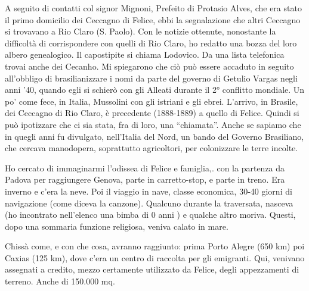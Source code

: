 \documentclass[a4paper,10pt]{book}
\begin{document}
A seguito di contatti col signor Mignoni, Prefeito di Protasio Alves, che era stato il primo domicilio dei Ceccagno di Felice, ebbi la segnalazione che altri Ceccagno si trovavano a Rio Claro (S. Paolo).\newline
Con le notizie ottenute, nonostante la difficoltà di corrispondere con quelli di Rio Claro, ho redatto una bozza del loro albero genealogico. Il capostipite si chiama Lodovico. Da una lista telefonica trovai anche dei Cecanho. Mi spiegarono che ciò può essere accaduto in seguito all’obbligo di brasilianizzare i nomi da parte del governo di Getulio Vargas negli anni ’40, quando egli si schierò con gli Alleati durante il 2° conflitto mondiale. Un po’ come fece, in Italia, Mussolini con gli istriani e gli ebrei.\newline
L’arrivo, in Brasile, dei  Ceccagno di Rio Claro, è precedente (1888-1889) a quello di Felice. Quindi si può ipotizzare che ci sia stata, fra di loro, una “chiamata”. Anche se sapiamo che in quegli anni fu divulgato, nell’Italia del Nord, un bando del Governo Brasiliano, che cercava manodopera, soprattutto agricoltori, per colonizzare le terre incolte. 

Ho cercato di immaginarmi l’odissea di Felice e famiglia,. con la partenza da Padova per raggiungere Genova, parte in carretto-stop, e parte in treno. Era inverno e c’era la neve. Poi il viaggio in nave, classe economica, 30-40 giorni di navigazione (come diceva la canzone). Qualcuno durante la traversata, nasceva (ho incontrato nell’elenco una bimba di 0 anni ) e qualche altro moriva. Questi, dopo una sommaria funzione religiosa, veniva calato in mare.  

Chissà come, e con che cosa, avranno raggiunto: prima Porto Alegre (650 km) poi Caxias (125 km), dove c’era un centro di raccolta per gli emigranti. Qui, venivano assegnati a credito, mezzo certamente utilizzato da Felice, degli appezzamenti di terreno. Anche di 150.000 mq.
\end{document}
